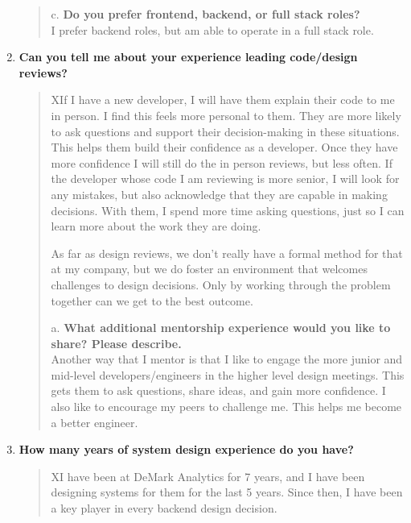 \begin{cvparagraph}
\begin{enumerate}
\begin{quote}
          c. \textbf{Do you prefer frontend, backend, or full stack roles?} \\
          I prefer backend roles, but am able to operate in a full stack role.

      \end{quote}
      \item \textbf{Can you tell me about your experience leading code/design reviews?} \\
      \begin{quote}
          XIf I have a new developer, I will have them explain their code to me in person.
          I find this feels more personal to them.
          They are more likely to ask questions and support their decision-making in these situations.
          This helps them build their confidence as a developer.
          Once they have more confidence I will still do the in person reviews, but less often.
          If the developer whose code I am reviewing is more senior, I will look for any mistakes, but also acknowledge that they are capable in making decisions.
          With them, I spend more time asking questions, just so I can learn more about the work they are doing.

          As far as design reviews, we don't really have a formal method for that at my company, but we do foster an environment that welcomes challenges to design decisions.
          Only by working through the problem together can we get to the best outcome.

          a. \textbf{What additional mentorship experience would you like to share? Please describe.} \\
          Another way that I mentor is that I like to engage the more junior and mid-level developers/engineers in the higher level design meetings.
          This gets them to ask questions, share ideas, and gain more confidence.
          I also like to encourage my peers to challenge me.
          This helps me become a better engineer.

      \end{quote}
      \item \textbf{How many years of system design experience do you have?} \\
      \begin{quote}
          XI have been at DeMark Analytics for 7 years, and I have been designing systems for them for the last 5 years.
          Since then, I have been a key player in every backend design decision.


\end{quote}
\end{enumerate}
\end{cvparagraph}
